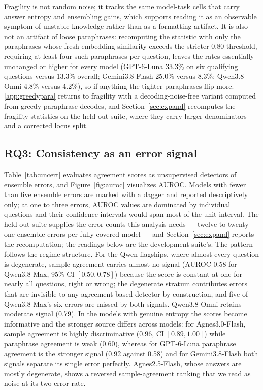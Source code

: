 Fragility is not random noise; it tracks the same model-task cells that carry answer entropy and ensembling gains, which supports reading it as an observable symptom of unstable knowledge rather than as a formatting artifact. It is also not an artifact of loose paraphrases: recomputing the statistic with only the paraphrases whose fresh embedding similarity exceeds the stricter 0.80 threshold, requiring at least four such paraphrases per question, leaves the rates essentially unchanged or higher for every model (GPT-6-Luna 33.3\% on six qualifying questions versus 13.3\% overall; Gemini3.8-Flash 25.0\% versus 8.3\%; Qwen3.8-Omni 4.8\% versus 4.2\%), so if anything the tighter paraphrases flip more. \ref{app:greedypara} returns to fragility with a decoding-noise-free variant computed from greedy paraphrase decodes, and Section~\ref{sec:expand} recomputes the fragility statistics on the held-out suite, where they carry larger denominators and a corrected locus split.

\subsection{RQ3: Consistency as an error signal}
\label{sec:rq3}

Table~\ref{tab:uncert} evaluates agreement scores as unsupervised detectors of ensemble errors, and Figure~\ref{fig:auroc} visualizes AUROC. Models with fewer than five ensemble errors are marked with a dagger and reported descriptively only; at one to three errors, AUROC values are dominated by individual questions and their confidence intervals would span most of the unit interval. The held-out suite supplies the error counts this analysis needs --- twelve to twenty-one ensemble errors per fully covered model --- and Section~\ref{sec:expand} reports the recomputation; the readings below are the development suite's. The pattern follows the regime structure. For the Qwen flagships, where almost every question is degenerate, sample agreement carries almost no signal (AUROC 0.58 for Qwen3.8-Max, 95\% CI $[0.50, 0.78]$) because the score is constant at one for nearly all questions, right or wrong; the degenerate stratum contributes errors that are invisible to any agreement-based detector by construction, and five of Qwen3.8-Max's six errors are missed by both signals. Qwen3.8-Omni retains moderate signal (0.79). In the models with genuine entropy the scores become informative and the stronger source differs across models: for Agnes3.0-Flash, sample agreement is highly discriminative (0.96, CI $[0.89, 1.00]$) while paraphrase agreement is weak (0.60), whereas for GPT-6-Luna paraphrase agreement is the stronger signal (0.92 against 0.58) and for Gemini3.8-Flash both signals separate its single error perfectly. Agnes2.5-Flash, whose answers are mostly degenerate, shows a reversed sample-agreement ranking that we read as noise at its two-error rate.

